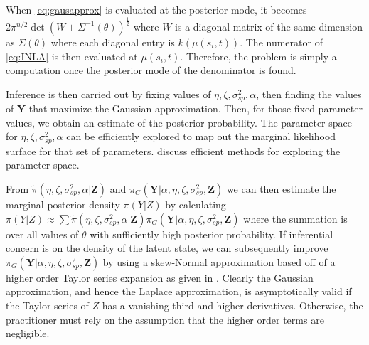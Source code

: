 \documentclass[11pt]{isuthesis}
\begin{document}
	When \eqref{eq:gausapprox} is evaluated at the posterior mode, it becomes $2 \pi^{n/2} \det (W+\Sigma^{-1}(\theta))^{\frac{1}{2}}$ where $W$ is a diagonal matrix of the same dimension as $\Sigma(\theta)$ where each diagonal entry is $k(\mu(s_i,t))$.  The numerator of \eqref{eq:INLA} is then evaluated at $\mu(s_i,t)$.  Therefore, the problem is simply a computation once the posterior mode of the denominator is found.
	
	Inference is then carried out by fixing values of $\eta,\zeta,\sigma_{sp}^2,\alpha$, then finding the values of $\boldsymbol{Y}$ that maximize the Gaussian approximation.  Then, for those fixed parameter values, we obtain an estimate of the posterior probability.  The parameter space for $\eta,\zeta,\sigma_{sp}^2,\alpha$ can be efficiently explored to map out the marginal likelihood surface for that set of parameters.  \cite{rue2009approximate} discuss efficient methods for exploring the parameter space.
	
	From $\tilde{\pi}(\eta,\zeta,\sigma_{sp}^2,\alpha|\boldsymbol{Z})$ and $\pi_G(\boldsymbol{Y}|\alpha,\eta,\zeta,\sigma_{sp}^2,\boldsymbol{Z})$ we can then estimate the marginal posterior density $\pi(Y|Z)$ by calculating $\pi(Y|Z) \approx \sum\tilde{\pi}(\eta,\zeta,\sigma_{sp}^2,\alpha|\boldsymbol{Z})\pi_G(\boldsymbol{Y}|\alpha,\eta,\zeta,\sigma_{sp}^2,\boldsymbol{Z})$ where the summation is over all values of $\theta$ with sufficiently high posterior probability.  If inferential concern is on the density of the latent state, we can subsequently improve $\pi_G(\boldsymbol{Y}|\alpha,\eta,\zeta,\sigma_{sp}^2,\boldsymbol{Z})$ by using a skew-Normal approximation based off of a higher order Taylor series expansion as given in \cite{rue2009approximate}.  Clearly the Gaussian approximation, and hence the Laplace approximation, is asymptotically valid if the Taylor series of $Z$ has a vanishing third and higher derivatives.  Otherwise, the practitioner must rely on the assumption that the higher order terms are negligible. 
	
\end{document}
